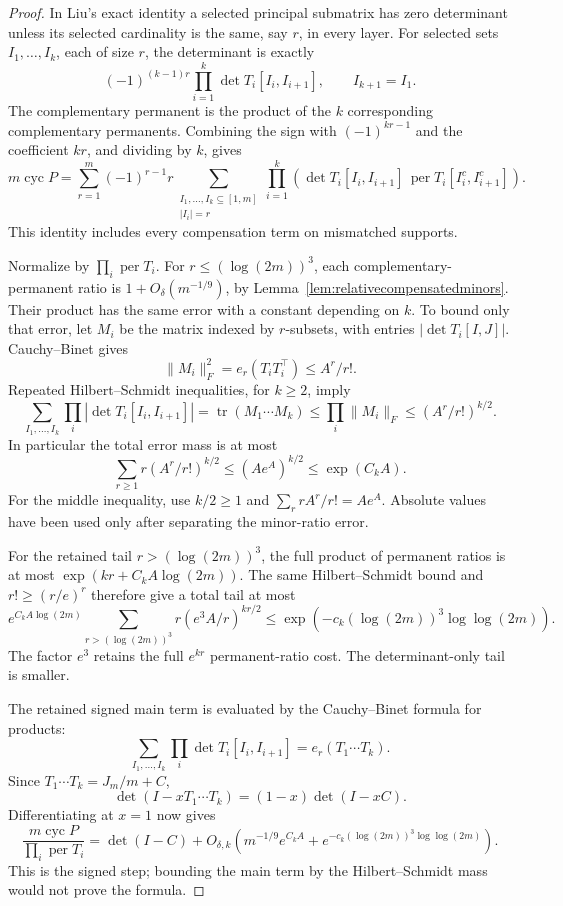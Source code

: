 \begin{proof}
In Liu's exact identity a selected principal submatrix has
zero determinant unless its selected cardinality is the
same, say \(r\), in every layer.
For selected sets \(I_1,\ldots,I_k\), each of size \(r\),
the determinant is exactly
\[
 (-1)^{(k-1)r}\prod_{i=1}^k
                    \det T_i[I_i,I_{i+1}],\qquad I_{k+1}=I_1.
\]
The complementary permanent is the product of the \(k\)
corresponding complementary permanents.
Combining the sign with \((-1)^{kr-1}\) and the coefficient
\(kr\), and dividing by \(k\), gives
\[
 m\operatorname{cyc}P
 =\sum_{r=1}^m(-1)^{r-1}r
  \sum_{\substack{I_1,\ldots,I_k\subseteq[1,m]\\|I_i|=r}}
  \prod_{i=1}^k
   \left(\det T_i[I_i,I_{i+1}]\,
        \operatorname{per}T_i[I_i^c,I_{i+1}^c]\right).
 \tag{20}
\]
This identity includes every compensation term on mismatched
supports.

Normalize by \(\prod_i\operatorname{per}T_i\).
For \(r\leq(\log(2m))^3\), each complementary-permanent
ratio is \(1+O_\delta(m^{-1/9})\), by
Lemma~\ref{lem:relativecompensatedminors}.
Their product has the same error with a constant depending on \(k\).
To bound only that error, let \(M_i\) be the matrix indexed
by \(r\)-subsets, with entries
\(|\det T_i[I,J]|\). Cauchy--Binet gives
\[
 \|M_i\|_F^2=e_r(T_iT_i^\top)\leq A^r/r!.
\]
Repeated Hilbert--Schmidt inequalities, for \(k\geq2\), imply
\[
 \sum_{I_1,\ldots,I_k}\prod_i|\det T_i[I_i,I_{i+1}]|
   =\operatorname{tr}(M_1\cdots M_k)
   \leq\prod_i\|M_i\|_F
   \leq(A^r/r!)^{k/2}.
\]
In particular the total error mass is at most
\[
 \sum_{r\geq1}r(A^r/r!)^{k/2}
               \leq(Ae^A)^{k/2}\leq\exp(C_kA).
\]
For the middle inequality, use \(k/2\geq1\) and
\(\sum_r rA^r/r!=Ae^A\).
Absolute values have been used only after separating the
minor-ratio error.

For the retained tail \(r>(\log(2m))^3\), the full product
of permanent ratios is at most \(\exp(kr+C_kA\log(2m))\).
The same Hilbert--Schmidt bound and \(r!\geq(r/e)^r\)
therefore give a total tail at most
\[
 e^{C_kA\log(2m)}
 \sum_{r>(\log(2m))^3}r
          (e^3A/r)^{kr/2}
 \leq \exp(-c_k(\log(2m))^3\log\log(2m)).
\]
The factor \(e^3\) retains the full \(e^{kr}\) permanent-ratio
cost. The determinant-only tail is smaller.

The retained signed main term is evaluated by the
Cauchy--Binet formula for products:
\[
 \sum_{I_1,\ldots,I_k}\prod_i\det T_i[I_i,I_{i+1}]
                       =e_r(T_1\cdots T_k).
\]
Since \(T_1\cdots T_k=J_m/m+C\),
\[
 \det(I-xT_1\cdots T_k)=(1-x)\det(I-xC).
\]
Differentiating at \(x=1\) now gives
\[
 \frac{m\operatorname{cyc}P}{\prod_i\operatorname{per}T_i}
 =\det(I-C)+
 O_{\delta,k}\left(m^{-1/9}e^{C_kA}
       +e^{-c_k(\log(2m))^3\log\log(2m)}\right).
\]
This is the signed step; bounding the main term by the
Hilbert--Schmidt mass would not prove the formula.


\end{proof}
